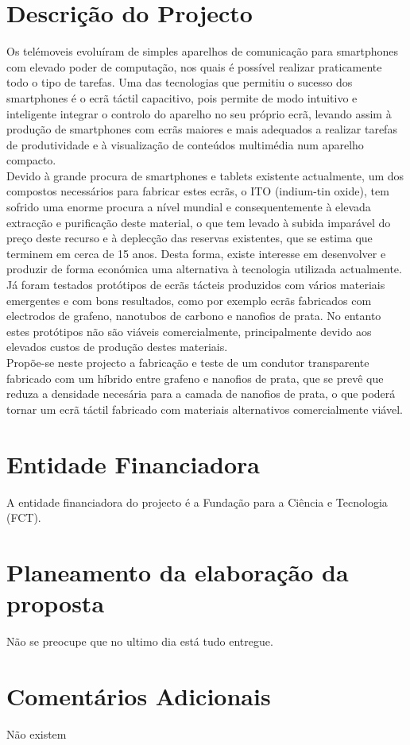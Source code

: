 \documentclass[%
	nofootinbib,
	amsmath,amssymb,
	aps,
	12pt,
	a4paper
]{article}
\begin{document}
\section{Descrição do Projecto}
Os telémoveis evoluíram de simples aparelhos de comunicação para smartphones com elevado poder de computação, nos quais é possível realizar praticamente todo o tipo de tarefas. Uma das tecnologias que permitiu o sucesso dos smartphones é o ecrã táctil capacitivo, pois permite de modo intuitivo e inteligente integrar o controlo do aparelho no seu próprio ecrã, levando assim à produção de smartphones com ecrãs maiores e mais adequados a realizar tarefas de produtividade e à visualização de conteúdos multimédia num aparelho compacto.\\
Devido à grande procura de smartphones e tablets existente actualmente, um dos compostos necessários para fabricar estes ecrãs, o ITO (indium-tin oxide), tem sofrido uma enorme procura a nível mundial e consequentemente à elevada extracção e purificação deste material, o que tem levado à subida imparável do preço deste recurso e à deplecção das reservas existentes, que se estima que terminem em cerca de 15 anos. Desta forma, existe interesse em desenvolver e produzir de forma económica uma alternativa à tecnologia utilizada actualmente.\\
Já foram testados protótipos de ecrãs tácteis produzidos com vários materiais emergentes e com bons resultados, como por exemplo ecrãs fabricados com electrodos de grafeno, nanotubos de carbono e nanofios de prata. No entanto estes protótipos não são viáveis comercialmente, principalmente devido aos elevados custos de produção destes materiais.\\
Propõe-se neste projecto a fabricação e teste de um condutor transparente fabricado com um híbrido entre grafeno e nanofios de prata, que se prevê que reduza a densidade necesária para a camada de nanofios de prata, o que poderá tornar um ecrã táctil fabricado com materiais alternativos comercialmente viável.
\section{Entidade Financiadora}
A entidade financiadora do projecto é a Fundação para a Ciência e Tecnologia (FCT).
\section{Planeamento da elaboração da proposta}
Não se preocupe que no ultimo dia está tudo entregue.
\section{Comentários Adicionais}
Não existem



\nocite{*}
{}
\end{document}
